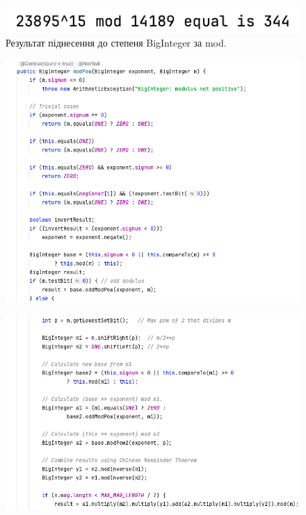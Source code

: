 \begin{figure}[h]
     \centering
     \includegraphics[scale = 0.5]{../IMAGES/Java/BigInt_modPow_output.png}
     \caption{Результат піднесення до степеня BigInteger за mod.}
     \label{fig_java_mPow2}
\end{figure}
\vspace{10pt}
\begin{figure}[h]
     \centering
     \includegraphics[scale = 0.5]{../IMAGES/Java/BigInt_modPow1.png}
     \label{fig_java_mPow3}
\end{figure}
\vspace{-1cm}
\begin{figure}[h]
     \centering
     \includegraphics[scale = 0.5]{../IMAGES/Java/BigInt_modPow2.png}
     \label{fig_java_mPow4}
\end{figure}
